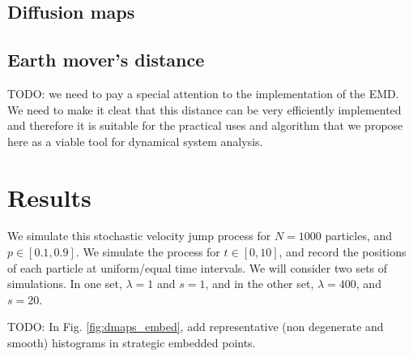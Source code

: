 \documentclass[prl,preprint]{revtex4-1}
\begin{document}
\subsection{Diffusion maps}

\subsection{Earth mover's distance}

TODO: we need to pay a special attention to the implementation of the EMD. We need to make it cleat that this distance can be very efficiently implemented  and therefore it is suitable for the practical uses and algorithm that we propose here as a viable tool for dynamical system analysis.

\section{Results}
We simulate this stochastic velocity jump process for $N=1000$ particles, and $p \in [0.1, 0.9]$.
%
We simulate the process for $t \in [0, 10]$, and record the positions of each particle at uniform/equal time intervals.
%
We will consider two sets of simulations.
%
In one set, $\lambda = 1$ and $s=1$, and in the other set, $\lambda = 400$, and $s=20$.

TODO: In Fig. \ref{fig:dmaps_embed}, add representative (non degenerate and smooth) histograms in strategic embedded points.
\end{document}
